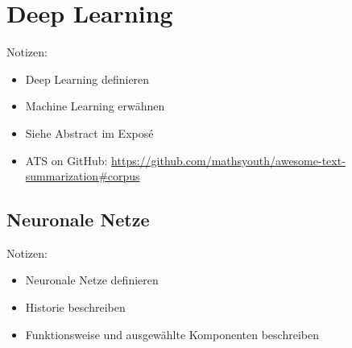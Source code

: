 \chapter{Deep Learning}
\thispagestyle{fancy}
\label{chap:Deep Learning}

Notizen:
\begin{itemize}
	\item Deep Learning definieren
	\item Machine Learning erwähnen
	\item Siehe Abstract im Exposé
	\item ATS on GitHub: \url{https://github.com/mathsyouth/awesome-text-summarization#corpus}
\end{itemize}


\section{Neuronale Netze}
Notizen:
\begin{itemize}
	\item Neuronale Netze definieren
	\item Historie beschreiben
	\item Funktionsweise und ausgewählte Komponenten beschreiben
\end{itemize}


